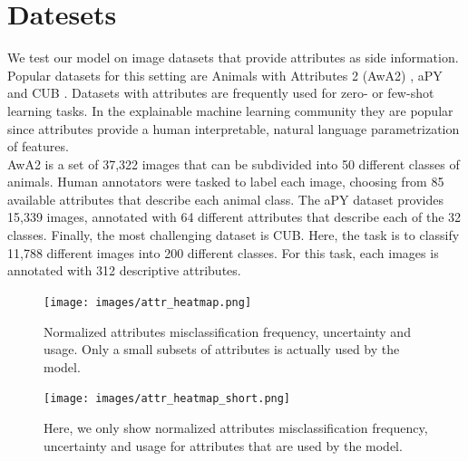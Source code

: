 \documentclass[a4paper,cleardoubleempty,BCOR1cm, 11pt]{report}
\begin{document}
\section{Datesets}
We test our model on image datasets that provide attributes as side information. Popular datasets for this setting are Animals with Attributes 2 (AwA2) \cite{8413121}, aPY \cite{farhadi2009describing} and CUB \cite{WahCUB_200_2011}. Datasets with attributes are frequently used for zero- or few-shot learning tasks. In the explainable machine learning community they are popular since attributes provide a human interpretable, natural language parametrization of features.\\
AwA2 is a set of 37,322 images that can be subdivided into 50 different classes of animals. Human annotators were tasked to label each image, choosing from 85 available attributes that describe each animal class. The aPY dataset provides 15,339 images, annotated with 64 different attributes that describe each of the 32 classes. Finally, the most challenging dataset is CUB. Here, the task is to classify 11,788 different images into 200 different classes. For this task, each images is annotated with 312 descriptive attributes.

\begin{figure}[t!]
	\centering
	\texttt{[image: images/attr\_heatmap.png]} 
	\caption{Normalized attributes misclassification frequency, uncertainty and usage. Only a small subsets of attributes is actually used by the model.}
	\label{fig:all_attrs}
\end{figure}
\begin{figure}[t!]
	\centering
	\texttt{[image: images/attr\_heatmap\_short.png]} 
	\caption{Here, we only show normalized attributes misclassification frequency, uncertainty and usage for attributes that are used by the model.}
	\label{fig:less_attrs}
\end{figure}
\end{document}

